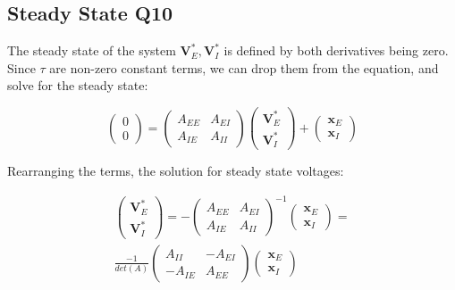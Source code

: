\documentclass[10pt,twocolumn]{article}
\begin{document}
\subsection{Steady State Q10}
The steady state of the system $\textbf{V}^\ast_E,\textbf{V}^\ast_I$ is defined  by
both derivatives being zero. Since $\tau$ are non-zero constant terms, we can drop
them from the equation, and solve for the steady state:

$$
    \begin{pmatrix}
        0 \\ 0
    \end{pmatrix}
    =
    \begin{pmatrix}
        A_{EE} & A_{EI} \\
        A_{IE} & A_{II}
    \end{pmatrix}
    \begin{pmatrix}
        \textbf{V}^\ast_E \\ \textbf{V}^\ast_I
    \end{pmatrix}+
    \begin{pmatrix}
        \textbf{x}_E \\ \textbf{x}_I
    \end{pmatrix}
$$

Rearranging the terms, the solution for steady state voltages:

$$
    \begin{align*}
        \begin{pmatrix}
            \textbf{V}^\ast_E \\ \textbf{V}^\ast_I
        \end{pmatrix}
        =
        -\begin{pmatrix}
             A_{EE} & A_{EI} \\
             A_{IE} & A_{II}
         \end{pmatrix}^{-1}
        \begin{pmatrix}
            \textbf{x}_E \\ \textbf{x}_I
        \end{pmatrix}
        =
        \\
        \frac{-1}{det(A)}
        \begin{pmatrix}
            A_{II}  & -A_{EI} \\
            -A_{IE} & A_{EE}
        \end{pmatrix}
        \begin{pmatrix}
            \textbf{x}_E \\ \textbf{x}_I
        \end{pmatrix}
    \end{align*}
$$
\end{document}
